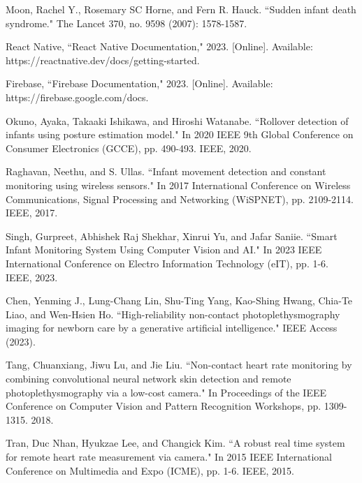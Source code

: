 \documentclass[12pt,a4paper]{report}
\begin{document}
\begin{thebibliography}{35}
Moon, Rachel Y., Rosemary SC Horne, and Fern R. Hauck. ``Sudden infant death syndrome." The Lancet 370, no. 9598 (2007): 1578-1587.

React Native, ``React Native Documentation," 2023. [Online]. Available: https://reactnative.dev/docs/getting-started.

Firebase, ``Firebase Documentation," 2023. [Online]. Available: https://firebase.google.com/docs.


Okuno, Ayaka, Takaaki Ishikawa, and Hiroshi Watanabe. ``Rollover detection of infants using posture estimation model." In 2020 IEEE 9th Global Conference on Consumer Electronics (GCCE), pp. 490-493. IEEE, 2020.

Raghavan, Neethu, and S. Ullas. ``Infant movement detection and constant monitoring using wireless sensors." In 2017 International Conference on Wireless Communications, Signal Processing and Networking (WiSPNET), pp. 2109-2114. IEEE, 2017.

Singh, Gurpreet, Abhishek Raj Shekhar, Xinrui Yu, and Jafar Saniie. ``Smart Infant Monitoring System Using Computer Vision and AI." In 2023 IEEE International Conference on Electro Information Technology (eIT), pp. 1-6. IEEE, 2023.

Chen, Yenming J., Lung-Chang Lin, Shu-Ting Yang, Kao-Shing Hwang, Chia-Te Liao, and Wen-Hsien Ho. ``High-reliability non-contact photoplethysmography imaging for newborn care by a generative artificial intelligence." IEEE Access (2023).

Tang, Chuanxiang, Jiwu Lu, and Jie Liu. ``Non-contact heart rate monitoring by combining convolutional neural network skin detection and remote photoplethysmography via a low-cost camera." In Proceedings of the IEEE Conference on Computer Vision and Pattern Recognition Workshops, pp. 1309-1315. 2018.

Tran, Duc Nhan, Hyukzae Lee, and Changick Kim. ``A robust real time system for remote heart rate measurement via camera." In 2015 IEEE International Conference on Multimedia and Expo (ICME), pp. 1-6. IEEE, 2015.

\end{thebibliography}
\end{document}
